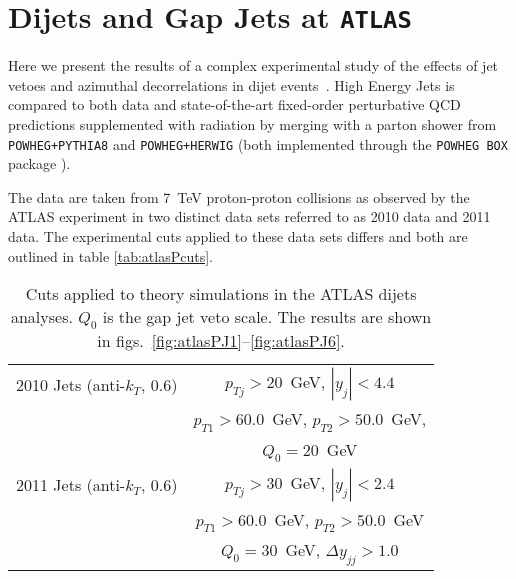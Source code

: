 
\chapter{Dijets and Gap Jets at \texttt{ATLAS}}
\label{chap:ATLAS}

	Here we present the results of a complex experimental study of the effects of jet vetoes and
	azimuthal decorrelations in dijet events~\cite{Aad:2014pua}.  High Energy Jets is compared
	to both data and state-of-the-art fixed-order perturbative QCD predictions supplemented with
	radiation by merging with a parton shower from \texttt{POWHEG+PYTHIA8} and \texttt{POWHEG+HERWIG} (both implemented through the \texttt{POWHEG BOX} package
	\cite{1126-6708-2004-11-040}).

	The data are taken from 7~TeV proton-proton collisions as observed by the ATLAS
	experiment in two distinct data sets referred to as 2010 data and 2011 data.  The
	experimental cuts applied to these data sets differs and both are outlined in table
	\eqref{tab:atlasPcuts}.

	\begin{table}[bth]
	  \centering
	  \begin{tabular}{|l|c|}
	    \hline
	    2010 Jets (anti-$k_T$, 0.6) & $p_{Tj}>20$~GeV, \; $|y_j|<4.4$ \\
	    & $p_{T1}> 60.0$~GeV, \; $p_{T2}> 50.0$~GeV, \; \\
	    & $Q_0=20$~GeV \\
	    \hline
	    2011 Jets (anti-$k_T$, 0.6) & $p_{Tj}>30$~GeV, \; $|y_j|<2.4$ \\
	    & $p_{T1}> 60.0$~GeV, \; $p_{T2}> 50.0$~GeV \\
	    & \; $Q_0=30$~GeV, \; $\Delta y_{jj}>1.0$\\
	\hline
	  \end{tabular}
	  \caption{Cuts applied to theory simulations in the ATLAS dijets analyses.
	  $Q_0$ is the gap jet veto scale. The results are shown in
	  figs.~\eqref{fig:atlasPJ1}--\eqref{fig:atlasPJ6}.}
	  \label{tab:atlasPcuts}
	\end{table}


